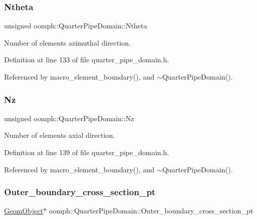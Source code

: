 \subsubsection{\texorpdfstring{Ntheta}{Ntheta}}
{\footnotesize\ttfamily unsigned oomph\+::\+Quarter\+Pipe\+Domain\+::\+Ntheta\hspace{0.3cm}{\ttfamily [private]}}



Number of elements azimuthal direction. 



Definition at line 133 of file quarter\+\_\+pipe\+\_\+domain.\+h.



Referenced by macro\+\_\+element\+\_\+boundary(), and $\sim$\+Quarter\+Pipe\+Domain().

\mbox{\label{classoomph_1_1QuarterPipeDomain_aab1bf3900c3537c44942e3fee0c3d24e}} 
\subsubsection{\texorpdfstring{Nz}{Nz}}
{\footnotesize\ttfamily unsigned oomph\+::\+Quarter\+Pipe\+Domain\+::\+Nz\hspace{0.3cm}{\ttfamily [private]}}



Number of elements axial direction. 



Definition at line 139 of file quarter\+\_\+pipe\+\_\+domain.\+h.



Referenced by macro\+\_\+element\+\_\+boundary(), and $\sim$\+Quarter\+Pipe\+Domain().

\mbox{\label{classoomph_1_1QuarterPipeDomain_adad2a4e638bb58eda89a19eaf5e18969}} 
\subsubsection{\texorpdfstring{Outer\+\_\+boundary\+\_\+cross\+\_\+section\+\_\+pt}{Outer\_boundary\_cross\_section\_pt}}
{\footnotesize\ttfamily \hyperlink{classoomph_1_1GeomObject}{Geom\+Object}$\ast$ oomph\+::\+Quarter\+Pipe\+Domain\+::\+Outer\+\_\+boundary\+\_\+cross\+\_\+section\+\_\+pt\hspace{0.3cm}{\ttfamily [private]}}



